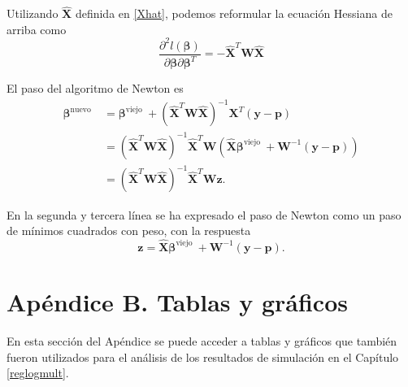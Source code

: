 \documentclass{report}
\begin{document}
  
  Utilizando $\hat{\boldsymbol{X}}$  definida en \eqref{Xhat},  podemos reformular la ecuación Hessiana de arriba como 
  $$
  \frac{\partial^2 l( \boldsymbol{\beta})}{\partial  \boldsymbol{\beta} \partial  \boldsymbol{\beta}^T}=-\hat{\boldsymbol{X}}^T \mathbf{W} \hat{\boldsymbol{X}}
  $$
  
  
  El paso del algoritmo de Newton es 
  $$
  \begin{aligned}
  	\boldsymbol{\beta}^{\text {nuevo }} & = \boldsymbol{\beta}^{\text {viejo }}+\left(\hat{\boldsymbol{X}}^T \mathbf{W} \hat{\boldsymbol{X}}\right)^{-1} \mathbf{X}^T(\mathbf{y}-\mathbf{p}) \\
  	& =\left(\hat{\boldsymbol{X}}^T \mathbf{W} \hat{\boldsymbol{X}}\right)^{-1} \hat{\boldsymbol{X}}^T \mathbf{W}\left(\hat{\boldsymbol{X}}  \boldsymbol{\beta}^{\text {viejo }}+\mathbf{W}^{-1}(\mathbf{y}-\mathbf{p})\right) \\
  	& =\left(\hat{\boldsymbol{X}}^T \mathbf{W} \hat{\boldsymbol{X}}\right)^{-1} \hat{\boldsymbol{X}}^T \mathbf{W} \mathbf{z} .
  \end{aligned}
  $$
  
  
  En la segunda y tercera línea se ha expresado el paso de Newton como un paso de mínimos cuadrados con peso, con la respuesta
  $$
  \mathbf{z}=\hat{\boldsymbol{X}}  \boldsymbol{\beta}^{\text {viejo }}+\mathbf{W}^{-1}(\mathbf{y}-\mathbf{p}) .
  $$
  
   \section*{Apéndice B. Tablas y gráficos }\label{conclus}
  
  En esta sección del Apéndice se puede acceder a tablas y gráficos que también fueron utilizados para el análisis de los resultados de simulación en el Capítulo \ref{reglogmult}.
  
\end{document}
